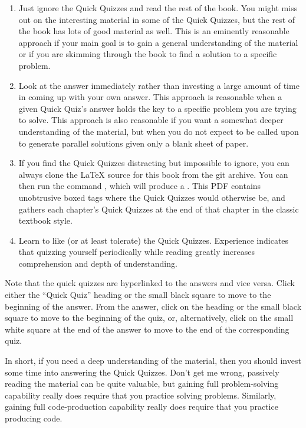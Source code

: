 {{\begin{enumerate}
\item	Just ignore the Quick Quizzes and read the rest of
	the book.
	You might miss out on the interesting material in
	some of the Quick Quizzes, but the rest of the book
	has lots of good material as well.
	This is an eminently reasonable approach if your main
	goal is to gain a general understanding of the material
	or if you are skimming through the book to find a
	solution to a specific problem.
\item	Look at the answer immediately rather than investing
	a large amount of time in coming up with your own
	answer.
	This approach is reasonable when a given Quick Quiz's
	answer holds the key to a specific problem you are
	trying to solve.
	This approach is also reasonable if you want a somewhat
	deeper understanding of the material, but when you do not
	expect to be called upon to generate parallel solutions given
	only a blank sheet of paper.
\item	If you find the Quick Quizzes distracting but impossible
	to ignore, you can always clone the \LaTeX{} source for
	this book from the git archive.
	You can then run the command , which will
	produce a .
	This PDF contains unobtrusive boxed tags where the Quick Quizzes
	would otherwise be, and gathers each chapter's Quick Quizzes
	at the end of that chapter in the classic textbook style.
\item	Learn to like (or at least tolerate) the Quick Quizzes.
	Experience indicates that quizzing yourself periodically
	while reading greatly increases comprehension and depth
	of understanding.
\end{enumerate}

Note that the quick quizzes are hyperlinked to the answers and vice versa.
Click either the ``Quick Quiz'' heading or the small black square
to move to the beginning of the answer.
From the answer, click on the heading or the small black square to
move to the beginning of the quiz, or, alternatively, click on the
small white square at the end of the answer to move to the end of the
corresponding quiz.
}\QuickQuizEndE
}

In short, if you need a deep
understanding of the material, then you should invest some time
into answering the Quick Quizzes.
Don't get me wrong, passively reading the material can be quite
valuable, but gaining full problem-solving capability really
does require that you practice solving problems.
Similarly, gaining full code-production capability really does
require that you practice producing code.


